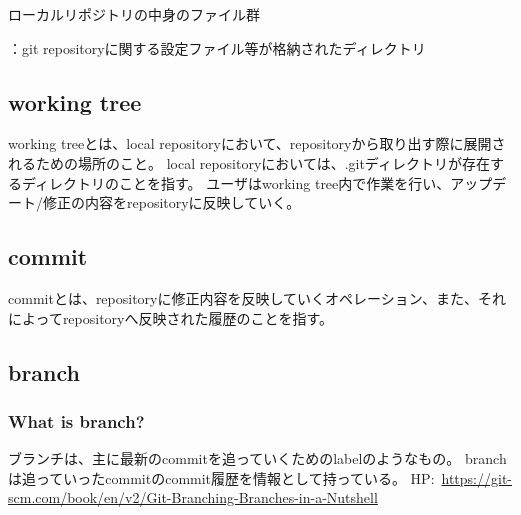 \documentclass[10pt,a4j,openany,dvipdfmx]{jsarticle}
\begin{document}
ローカルリポジトリの中身のファイル群
\begin{blueitemize}
  \item \textcolor{Red}{}：git repositoryに関する設定ファイル等が格納されたディレクトリ
  \item {}
  \item {}
\end{blueitemize}


\subsection{working tree} %
\label{sub:working_tree}

\begin{tcolorbox}[
title=working treeについて, fonttitle=\bfseries]
working treeとは、local repositoryにおいて、repositoryから取り出す際に展開されるための場所のこと。
local repositoryにおいては、.gitディレクトリが存在するディレクトリのことを指す。
ユーザはworking tree内で作業を行い、アップデート/修正の内容をrepositoryに反映していく。
\end{tcolorbox}

\subsection{commit} %
\label{sub:commit}

\begin{tcolorbox}[
title=commitについて, fonttitle=\bfseries]
commitとは、repositoryに修正内容を反映していくオペレーション、また、それによってrepositoryへ反映された履歴のことを指す。
\end{tcolorbox}

\subsection{branch} %
\label{sub:branch}

\subsubsection{What is branch?} %
\label{ssub:what_is_branch_}

\begin{tcolorbox}[
title=branchについて, fonttitle=\bfseries]
ブランチは、主に最新のcommitを追っていくためのlabelのようなもの。
branchは追っていったcommitのcommit履歴を情報として持っている。
\tcblower
HP:\ \url{https://git-scm.com/book/en/v2/Git-Branching-Branches-in-a-Nutshell}
\end{tcolorbox}
\end{document}
